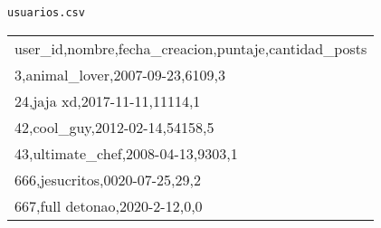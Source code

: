 \begin{center}
    \texttt{usuarios.csv} \\
	\begin{tabular}{|l|}
		\hline
user\_id,nombre,fecha\_creacion,puntaje,cantidad\_posts\\
3,animal\_lover,2007-09-23,6109,3\\
24,jaja xd,2017-11-11,11114,1\\
42,cool\_guy,2012-02-14,54158,5\\
43,ultimate\_chef,2008-04-13,9303,1\\
666,jesucritos,0020-07-25,29,2\\
667,full detonao,2020-2-12,0,0\\
		\hline
	\end{tabular}
\end{center}

